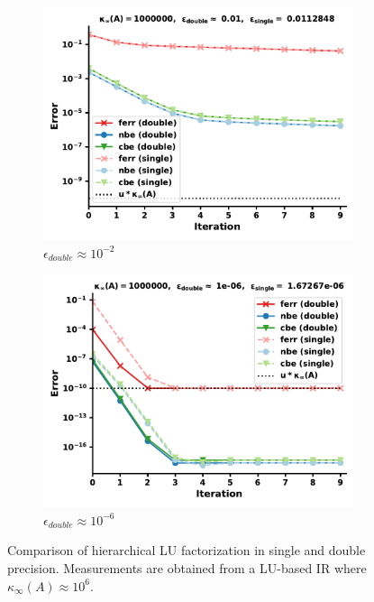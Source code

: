 \begin{figure}[h]
\centering
\begin{subfigure}{.5\textwidth}
  \centering
  \includegraphics[width=\linewidth]{chapters/5_experiments/figures/LU512_e2_0s.pdf}
  \caption{$\epsilon_{double} \approx 10^{-2}$}
  \label{fig:lrirs3_1}
\end{subfigure}%
\begin{subfigure}{.5\textwidth}
  \centering
  \includegraphics[width=\linewidth]{chapters/5_experiments/figures/LU512_e2_1s.pdf}
  \caption{$\epsilon_{double} \approx 10^{-6}$}
  \label{fig:lrirs3_2}
\end{subfigure}
\caption[Mixed Precision Low-Rank LU-IR 3]{Comparison of hierarchical LU factorization in single and double precision. Measurements are obtained from a LU-based IR where $\kappa_\infty(A) \approx 10^6$.}
\label{fig:lrirs3}
\end{figure}

